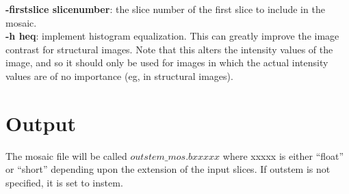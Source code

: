 \documentclass[10pt]{article}
\begin{document}
\noindent
{\bf -firstslice slicenumber}: the slice number of the first slice to
include in the mosaic. \\

\noindent
{\bf -h heq}: implement histogram equalization.  This can greatly
improve the image contrast for structural images.  Note that this
alters the intensity values of the image, and so it should only be
used for images in which the actual intensity values are of no
importance (eg, in structural images).\\


\section{Output}

The mosaic file will be called $outstem\_mos.bxxxxx$ where xxxxx is
either ``float'' or ``short'' depending upon the extension of the
input slices. If outstem is not specified, it is set to instem.
\end{document}
